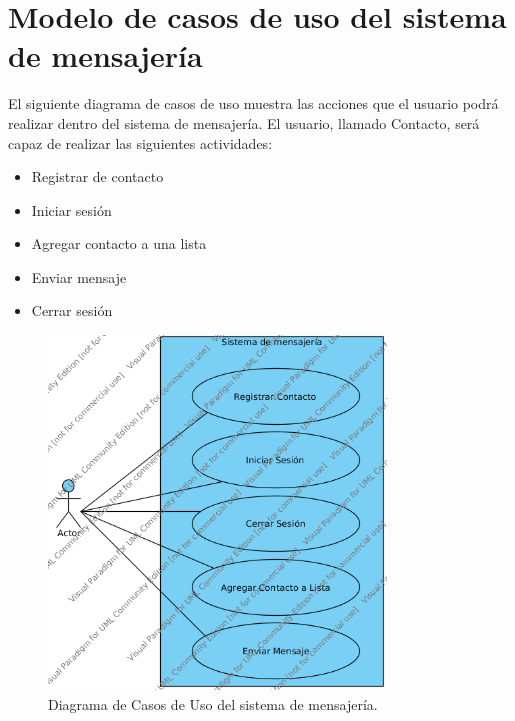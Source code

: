 \section{Modelo de casos de uso del sistema de mensajer\'ia}

El siguiente diagrama de casos de uso muestra las acciones que el usuario podr\'a realizar dentro del sistema de mensajer\'ia. El usuario, llamado Contacto, ser\'a capaz de realizar las siguientes actividades:
\begin{itemize}
	\item Registrar de contacto
\item Iniciar sesi\'on
\item Agregar contacto a una lista
\item Enviar mensaje
\item Cerrar sesi\'on
\end{itemize}
	\begin{figure}[htbp!]
		\centering
			\includegraphics[width=0.8\textwidth]{images/Diagramas/dcasosdeuso}
		\caption{Diagrama de Casos de Uso del sistema de mensajer\'ia.}
	\end{figure}
	
	
	\pagebreak
